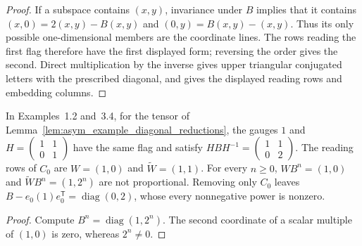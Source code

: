 \begin{proof}
    \leanok
    If a subspace contains $(x,y)$, invariance under $B$ implies that it
    contains $(x,0)=2(x,y)-B(x,y)$ and $(0,y)=B(x,y)-(x,y)$.
    Thus its only possible one-dimensional members are the coordinate lines.
    The rows reading the first flag therefore have the first displayed form;
    reversing the order gives the second. Direct multiplication by the inverse
    gives upper triangular conjugated letters with the prescribed diagonal,
    and gives the displayed reading rows and embedding columns.
\end{proof}

\begin{lemma}
    \label{lem:asym_example_diagonal_words}
    \leanok
    In Examples~1.2 and~3.4, for the tensor of
    Lemma~\ref{lem:asym_example_diagonal_reductions}, the gauges $1$ and
    $H=\left(\begin{smallmatrix}1&1\\0&1\end{smallmatrix}\right)$
    have the same flag and satisfy
    $HBH^{-1}=\left(\begin{smallmatrix}1&1\\0&2\end{smallmatrix}\right)$.
    The reading rows of $C_0$ are $W=(1,0)$ and $\widetilde W=(1,1)$.
    For every $n\geq0$, $WB^n=(1,0)$ and $\widetilde WB^n=(1,2^n)$ are not
    proportional. Removing only $C_0$ leaves
    $B-e_0(1)e_0^{\mathsf T}=\operatorname{diag}(0,2)$, whose every
    nonnegative power is nonzero.
\end{lemma}

\begin{proof}
    \leanok
    Compute $B^n=\operatorname{diag}(1,2^n)$. The second coordinate of a scalar
    multiple of $(1,0)$ is zero, whereas $2^n\neq0$.
\end{proof}

